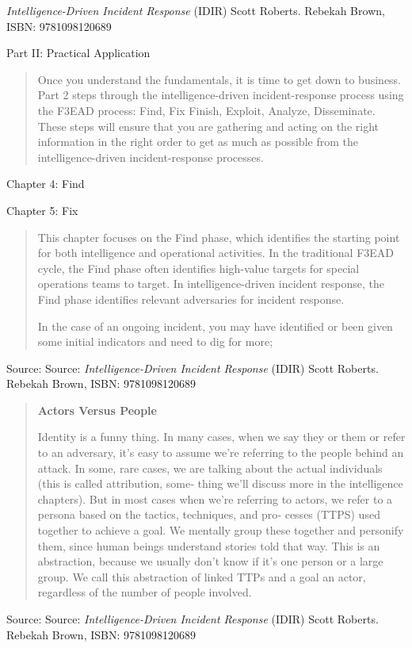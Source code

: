 \documentclass[Screen16to9,17pt]{foils}
\begin{document}

\emph{Intelligence-Driven Incident Response} (IDIR)
 Scott Roberts. Rebekah Brown, ISBN: 9781098120689

Part II: Practical Application

\begin{quote}
Once you understand the fundamentals, it is time to get down to business. Part 2
steps through the intelligence-driven incident-response process using the F3EAD
process: Find, Fix Finish, Exploit, Analyze, Disseminate. These steps will ensure that
you are gathering and acting on the right information in the right order to get as
much as possible from the intelligence-driven incident-response processes.
\end{quote}

\begin{list2}
\item Chapter 4: Find
\item Chapter 5: Fix
\end{list2}




\begin{quote}
This chapter focuses on the Find phase, which identifies the starting point for both
intelligence and operational activities. In the traditional F3EAD cycle, the Find phase
often identifies high-value targets for special operations teams to target. In
intelligence-driven incident response, the Find phase identifies relevant adversaries
for incident response.

In the case of an ongoing incident, you may have identified or been given some initial
indicators and need to dig for more;
\end{quote}
Source: Source: \emph{Intelligence-Driven Incident Response} (IDIR)
 Scott Roberts. Rebekah Brown, ISBN: 9781098120689




\begin{quote}
\centerline{\bf\Large Actors Versus People}

Identity is a funny thing. In many cases, when we say they or them or refer to an
adversary, it’s easy to assume we’re referring to the people behind an attack. In some,
rare cases, we are talking about the actual individuals (this is called attribution, some‐
thing we’ll discuss more in the intelligence chapters). But in most cases when we’re
referring to actors, we refer to a persona based on the tactics, techniques, and pro‐
cesses (TTPS) used together to achieve a goal. We mentally group these together and
personify them, since human beings understand stories told that way. This is an
abstraction, because we usually don’t know if it’s one person or a large group. We call
this abstraction of linked TTPs and a goal an actor, regardless of the number of people involved.
\end{quote}
Source: Source: \emph{Intelligence-Driven Incident Response} (IDIR)
 Scott Roberts. Rebekah Brown, ISBN: 9781098120689
\end{document}
